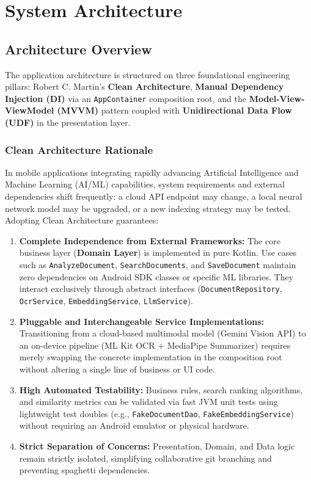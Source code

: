 \section{System Architecture}

\subsection{Architecture Overview}
The application architecture is structured on three foundational engineering pillars: Robert C. Martin's \textbf{Clean Architecture}, \textbf{Manual Dependency Injection (DI)} via an \texttt{AppContainer} composition root, and the \textbf{Model-View-ViewModel (MVVM)} pattern coupled with \textbf{Unidirectional Data Flow (UDF)} in the presentation layer.

\subsubsection{Clean Architecture Rationale}
In mobile applications integrating rapidly advancing Artificial Intelligence and Machine Learning (AI/ML) capabilities, system requirements and external dependencies shift frequently: a cloud API endpoint may change, a local neural network model may be upgraded, or a new indexing strategy may be tested. Adopting Clean Architecture guarantees:
\begin{enumerate}
    \item \textbf{Complete Independence from External Frameworks:}
    The core business layer (\textbf{Domain Layer}) is implemented in pure Kotlin. Use cases such as \texttt{AnalyzeDocument}, \texttt{SearchDocuments}, and \texttt{SaveDocument} maintain zero dependencies on Android SDK classes or specific ML libraries. They interact exclusively through abstract interfaces (\texttt{DocumentRepository}, \texttt{OcrService}, \texttt{EmbeddingService}, \texttt{LlmService}).
    
    \item \textbf{Pluggable and Interchangeable Service Implementations:}
    Transitioning from a cloud-based multimodal model (Gemini Vision API) to an on-device pipeline (ML Kit OCR + MediaPipe Summarizer) requires merely swapping the concrete implementation in the composition root without altering a single line of business or UI code.
    
    \item \textbf{High Automated Testability:}
    Business rules, search ranking algorithms, and similarity metrics can be validated via fast JVM unit tests using lightweight test doubles (e.g., \texttt{FakeDocumentDao}, \texttt{FakeEmbeddingService}) without requiring an Android emulator or physical hardware.
    
    \item \textbf{Strict Separation of Concerns:}
    Presentation, Domain, and Data logic remain strictly isolated, simplifying collaborative git branching and preventing spaghetti dependencies.
\end{enumerate}

